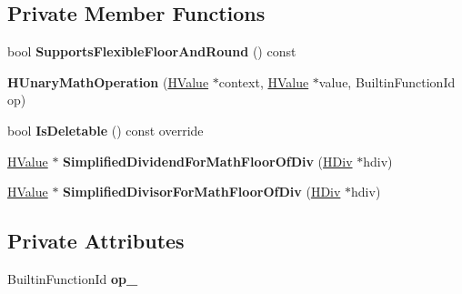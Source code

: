 \subsection*{Private Member Functions}
\begin{DoxyCompactItemize}
\item 
bool {\bfseries Supports\+Flexible\+Floor\+And\+Round} () const \hypertarget{classv8_1_1internal_1_1_h_unary_math_operation_a5f8b882cc3491f126f0dbff60458a12a}{}\label{classv8_1_1internal_1_1_h_unary_math_operation_a5f8b882cc3491f126f0dbff60458a12a}

\item 
{\bfseries H\+Unary\+Math\+Operation} (\hyperlink{classv8_1_1internal_1_1_h_value}{H\+Value} $\ast$context, \hyperlink{classv8_1_1internal_1_1_h_value}{H\+Value} $\ast$value, Builtin\+Function\+Id op)\hypertarget{classv8_1_1internal_1_1_h_unary_math_operation_ab6d8a05a5e931a5cb76c8927b171faa7}{}\label{classv8_1_1internal_1_1_h_unary_math_operation_ab6d8a05a5e931a5cb76c8927b171faa7}

\item 
bool {\bfseries Is\+Deletable} () const  override\hypertarget{classv8_1_1internal_1_1_h_unary_math_operation_ae1dcdf4f1f16629bd0844abda99045ca}{}\label{classv8_1_1internal_1_1_h_unary_math_operation_ae1dcdf4f1f16629bd0844abda99045ca}

\item 
\hyperlink{classv8_1_1internal_1_1_h_value}{H\+Value} $\ast$ {\bfseries Simplified\+Dividend\+For\+Math\+Floor\+Of\+Div} (\hyperlink{classv8_1_1internal_1_1_h_div}{H\+Div} $\ast$hdiv)\hypertarget{classv8_1_1internal_1_1_h_unary_math_operation_a70a3a5b2c65ef90327f47c578040704d}{}\label{classv8_1_1internal_1_1_h_unary_math_operation_a70a3a5b2c65ef90327f47c578040704d}

\item 
\hyperlink{classv8_1_1internal_1_1_h_value}{H\+Value} $\ast$ {\bfseries Simplified\+Divisor\+For\+Math\+Floor\+Of\+Div} (\hyperlink{classv8_1_1internal_1_1_h_div}{H\+Div} $\ast$hdiv)\hypertarget{classv8_1_1internal_1_1_h_unary_math_operation_a03b8bca978abef94f417f9f49773ddbe}{}\label{classv8_1_1internal_1_1_h_unary_math_operation_a03b8bca978abef94f417f9f49773ddbe}

\end{DoxyCompactItemize}
\subsection*{Private Attributes}
\begin{DoxyCompactItemize}
\item 
Builtin\+Function\+Id {\bfseries op\+\_\+}\hypertarget{classv8_1_1internal_1_1_h_unary_math_operation_a19961a41e9201c6b3a8f15195f9ba23b}{}\label{classv8_1_1internal_1_1_h_unary_math_operation_a19961a41e9201c6b3a8f15195f9ba23b}

\end{DoxyCompactItemize}

